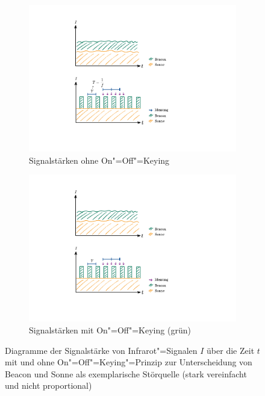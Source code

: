 {\begin{figure}[h]
    \centering
    \begin{subfigure}{0.8\textwidth}
        \centering
        \includegraphics[width=\textwidth]{../assets/on-off-keying-1.pdf}
        \caption{Signalstärken ohne On"=Off"=Keying}
    \end{subfigure}
    \hspace{0.5cm}
    \begin{subfigure}{0.8\textwidth}
        \includegraphics[width=\textwidth]{../assets/on-off-keying-2.pdf}
        \caption{Signalstärken mit On"=Off"=Keying (grün)}
    \end{subfigure}
    \caption{Diagramme der Signalstärke von Infrarot"=Signalen $I$ über die Zeit $t$ mit und ohne On"=Off"=Keying"=Prinzip zur Unterscheidung von Beacon und Sonne als exemplarische Störquelle (stark vereinfacht und nicht proportional)}
    \label{fig:on-off-keying}
\end{figure}

}
